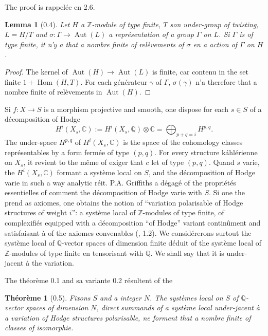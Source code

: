 \documentclass[12pt,a4paper]{article}
\theoremstyle{plain}
\newtheorem{theorem}{Th\'{e}or\`{e}me}[section]
\newtheorem{lemma}{Lemma}[section]
\theoremstyle{definition}
\DeclareMathOperator{\Hom}{Hom}
\DeclareMathOperator{\Aut}{Aut}
\newcommand{\CC}{\mathbb{C}}
\newcommand{\QQ}{\mathbb{Q}}
\newcommand{\ZZ}{\mathbb{Z}}
\begin{document}
The proof is rappel\'{e}e en 2.6.

\begin{lemma}[0.4]
Let $H$ a $\ZZ$-module of type finite, $T$ son under-group of twisting, $L = H/T$ and $\sigma : \Gamma \to \Aut(L)$ a repr\'{e}sentation of a group $\Gamma$ on $L$. Si $\Gamma$ is of type finite, it n'y a that a nombre finite of rel\`{e}vements of $\sigma$ en a action of $\Gamma$ on $H$.
\end{lemma}

\begin{proof}
The kernel of $\Aut(H) \to \Aut(L)$ is finite, car contenu in the set finite $1 + \Hom(H, T)$. For each g\'{e}n\'{e}rateur $\gamma$ of $\Gamma$, $\sigma(\gamma)$ n'a therefore that a nombre finite of rel\`{e}vements in $\Aut(H)$.
\end{proof}

Si $f : X \to S$ is a morphism projective and smooth, one dispose for each $s \in S$ of a d\'{e}composition of Hodge
\[
H^{i}(X_{s}, \CC) := H^{i}(X_{s}, \QQ) \otimes \CC = \bigoplus_{p+q=i} H^{p,q}.
\]
The under-space $H^{p,q}$ of $H^{i}(X_{s}, \CC)$ is the space of the cohomology classes repr\'{e}sentables by a form ferm\'{e}e of type $(p,q)$. For every structure k\'{a}hl\'{e}rienne on $X_{s}$, it revient to the m\^{e}me of exiger that $c$ let of type $(p,q)$. Quand $s$ varie, the $H^{i}(X_{s}, \CC)$ formant a syst\`{e}me local on $S$, and the d\'{e}composition of Hodge varie in such a way analytic r\'{e}it. P.A. Griffiths a d\'{e}gag\'{e} of the propri\'{e}t\'{e}s essentielles of comment the d\'{e}composition of Hodge varie with $S$. Si one the prend as axiomes, one obtains the notion of ``variation polarisable of Hodge structures of weight $i$'': a syst\`{e}me local of $\ZZ$-modules of type finite, of complexifi\'{e}s equipped with a d\'{e}composition ``of Hodge'' variant contin\^{u}ment and satisfaisant \`{a} of the axiomes convenables (\cite{GriffithsIII}, 1.2). We consid\'{e}rerons surtout the syst\`{e}me local of $\QQ$-vector spaces of dimension finite d\'{e}duit of the syst\`{e}me local of $\ZZ$-modules of type finite en tensorisant with $\QQ$. We shall say that it is under-jacent \`{a} the variation.

The th\'{e}or\`{e}me 0.1 and sa variante 0.2 r\'{e}sultent of the

\begin{theorem}[0.5]
Fixons $S$ and a integer $N$. The syst\`{e}mes local on $S$ of $\QQ$-vector spaces of dimension $N$, direct summands of a syst\`{e}me local under-jacent \`{a} a variation of Hodge structures polarisable, ne forment that a nombre finite of classes of isomorphie.
\end{theorem}
\end{document}
